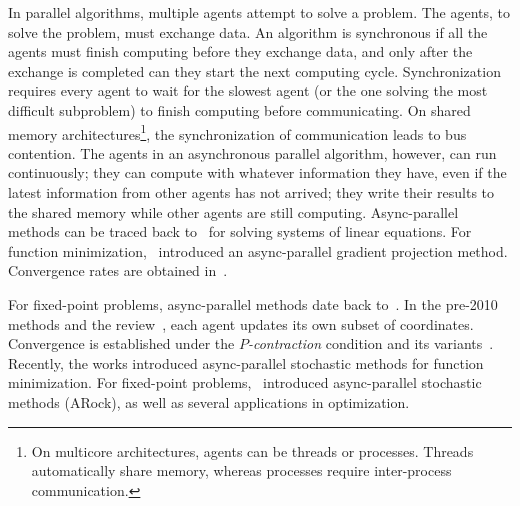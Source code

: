 In  parallel algorithms, multiple agents attempt to solve a problem. The agents, to solve the problem, must exchange data. An algorithm is synchronous if all the agents must finish computing before they exchange data, and only after the exchange is completed can they start the next computing cycle.  Synchronization requires every agent to wait for the slowest agent
(or the one solving the most difficult subproblem) to finish computing before communicating. On shared memory architectures\footnote{On multicore architectures, agents can be threads or processes. Threads automatically share memory, whereas processes require inter-process communication.}, the synchronization of communication leads to bus contention. The agents in an asynchronous parallel algorithm, however, can run continuously; they can compute with whatever information they have, even if the latest information from other agents
has not arrived; they write their results to the shared memory while other agents are still computing. Async-parallel methods can be traced back to~\citep{chazan1969chaotic} for solving systems of linear equations.
For function minimization,~\citep{bertsekas1989parallel} introduced an async-parallel gradient projection method. Convergence rates are obtained in~\citep{tseng1991rate-asyn}.

For fixed-point problems, async-parallel methods date back to~\citep{baudet1978asynchronous}. In  the pre-2010 methods \citep{bertsekas1983distributed,BMR1997asyn-multisplit,el1998flexible,Baz200591} and the review~\citep{frommer2000asynchronous}, each agent updates its own subset of coordinates. Convergence is established under the \emph{$P$-contraction} condition and its variants~\citep{bertsekas1983distributed}. Recently, the works \citep{nedic2001distributed,recht2011hogwild,liu2013asynchronous,liu2014asynchronous,hsieh2015passcode} introduced async-parallel stochastic methods for function minimization.
For fixed-point problems,~\citep{PengXuYanYin2015_arock} introduced async-parallel stochastic methods (ARock), as well as several applications in optimization.



